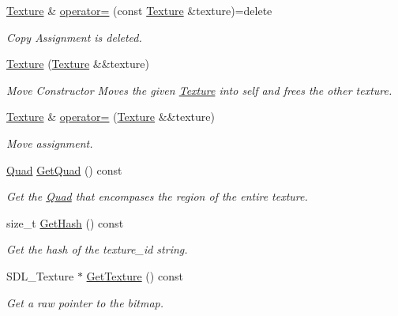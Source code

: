 \begin{DoxyCompactItemize}
\mbox{\label{classinferno_1_1graphics_1_1_texture_a43833ad31daec597f4b10bd95b4f9e24}} 
\mbox{\hyperlink{classinferno_1_1graphics_1_1_texture}{Texture}} \& \mbox{\hyperlink{classinferno_1_1graphics_1_1_texture_a43833ad31daec597f4b10bd95b4f9e24}{operator=}} (const \mbox{\hyperlink{classinferno_1_1graphics_1_1_texture}{Texture}} \&texture)=delete
\begin{DoxyCompactList}\small\item\em Copy Assignment is deleted. \end{DoxyCompactList}\item 
\mbox{\hyperlink{classinferno_1_1graphics_1_1_texture_ad7eaa953877ac0b52e215db9840deb53}{Texture}} (\mbox{\hyperlink{classinferno_1_1graphics_1_1_texture}{Texture}} \&\&texture)
\begin{DoxyCompactList}\small\item\em Move Constructor Moves the given \mbox{\hyperlink{classinferno_1_1graphics_1_1_texture}{Texture}} into self and frees the other texture. \end{DoxyCompactList}\item 
\mbox{\hyperlink{classinferno_1_1graphics_1_1_texture}{Texture}} \& \mbox{\hyperlink{classinferno_1_1graphics_1_1_texture_a5409fce4e118c09b6caa012ced780a59}{operator=}} (\mbox{\hyperlink{classinferno_1_1graphics_1_1_texture}{Texture}} \&\&texture)
\begin{DoxyCompactList}\small\item\em Move assignment. \end{DoxyCompactList}\item 
\mbox{\hyperlink{classinferno_1_1graphics_1_1_quad}{Quad}} \mbox{\hyperlink{classinferno_1_1graphics_1_1_texture_a34c8a8546474066c66849ca2aceba0fd}{Get\+Quad}} () const
\begin{DoxyCompactList}\small\item\em Get the \mbox{\hyperlink{classinferno_1_1graphics_1_1_quad}{Quad}} that encompases the region of the entire texture. \end{DoxyCompactList}\item 
size\+\_\+t \mbox{\hyperlink{classinferno_1_1graphics_1_1_texture_a4c1750e2d5574096d70bdb4cf3b91162}{Get\+Hash}} () const
\begin{DoxyCompactList}\small\item\em Get the hash of the texture\+\_\+id string. \end{DoxyCompactList}\item 
S\+D\+L\+\_\+\+Texture $\ast$ \mbox{\hyperlink{classinferno_1_1graphics_1_1_texture_a42df17ded08f76751332725d66a88ce2}{Get\+Texture}} () const
\begin{DoxyCompactList}\small\item\em Get a raw pointer to the bitmap. \end{DoxyCompactList}\end{DoxyCompactItemize}


